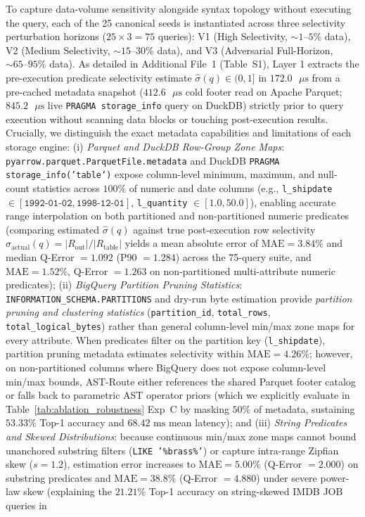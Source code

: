 \documentclass[10pt,a4paper]{article}
\begin{document}
To capture data-volume sensitivity alongside syntax topology without executing the query, each of the 25 canonical seeds is instantiated across three selectivity perturbation horizons ($25 \times 3 = 75$ queries): V1 (High Selectivity, $\sim 1\text{--}5\%$ data), V2 (Medium Selectivity, $\sim 15\text{--}30\%$ data), and V3 (Adversarial Full-Horizon, $\sim 65\text{--}95\%$ data). As detailed in Additional File~1 (Table~S1), Layer 1 extracts the pre-execution predicate selectivity estimate $\hat{\sigma}(q) \in (0, 1]$ in $172.0\text{ }\mu\text{s}$ from a pre-cached metadata snapshot ($412.6\text{ }\mu\text{s}$ cold footer read on Apache Parquet; $845.2\text{ }\mu\text{s}$ live \texttt{PRAGMA storage\_\allowbreak{}info} query on DuckDB) strictly prior to query execution without scanning data blocks or touching post-execution results. Crucially, we distinguish the exact metadata capabilities and limitations of each storage engine: (i) \emph{Parquet and DuckDB Row-Group Zone Maps}: \texttt{pyarrow.parquet.ParquetFile.metadata} and DuckDB \texttt{PRAGMA storage\_\allowbreak{}info('table')} expose column-level minimum, maximum, and null-count statistics across $100\%$ of numeric and date columns (e.g., \texttt{l\_\allowbreak{}shipdate} $\in [\texttt{1992-01-02}, \texttt{1998-12-01}]$, \texttt{l\_\allowbreak{}quantity} $\in [1.0, 50.0]$), enabling accurate range interpolation on both partitioned and non-partitioned numeric predicates (comparing estimated $\hat{\sigma}(q)$ against true post-execution row selectivity $\sigma_{\text{actual}}(q) = |R_{\text{out}}|/|R_{\text{table}}|$ yields a mean absolute error of $\text{MAE}=3.84\%$ and median Q-Error $=1.092$ (P90 $= 1.284$) across the 75-query suite, and $\text{MAE}=1.52\%$, Q-Error $=1.263$ on non-partitioned multi-attribute numeric predicates); (ii) \emph{BigQuery Partition Pruning Statistics}: \texttt{INFORMATION\_\allowbreak{}SCHEMA.}\newline\texttt{PARTITIONS} and dry-run byte estimation provide \emph{partition pruning and clustering statistics} (\texttt{partition\_\allowbreak{}id}, \texttt{total\_\allowbreak{}rows}, \texttt{total\_\allowbreak{}logical\_\allowbreak{}bytes}) rather than general column-level min/max zone maps for every attribute. When predicates filter on the partition key (\texttt{l\_\allowbreak{}shipdate}), partition pruning metadata estimates selectivity within $\text{MAE}=4.26\%$; however, on non-partitioned columns where BigQuery does not expose column-level min/max bounds, AST-Route either references the shared Parquet footer catalog or falls back to parametric AST operator priors (which we explicitly evaluate in Table~\ref{tab:ablation_robustness} Exp~C by masking $50\%$ of metadata, sustaining $53.33\%$ Top-1 accuracy and $68.42\text{ ms}$ mean latency); and (iii) \emph{String Predicates and Skewed Distributions}: because continuous min/max zone maps cannot bound unanchored substring filters (\texttt{LIKE '\%brass\%'}) or capture intra-range Zipfian skew ($s=1.2$), estimation error increases to $\text{MAE}=5.00\%$ (Q-Error $=2.000$) on substring predicates and $\text{MAE}=38.8\%$ (Q-Error $=4.880$) under severe power-law skew (explaining the $21.21\%$ Top-1 accuracy on string-skewed IMDB JOB queries in 
\end{document}
